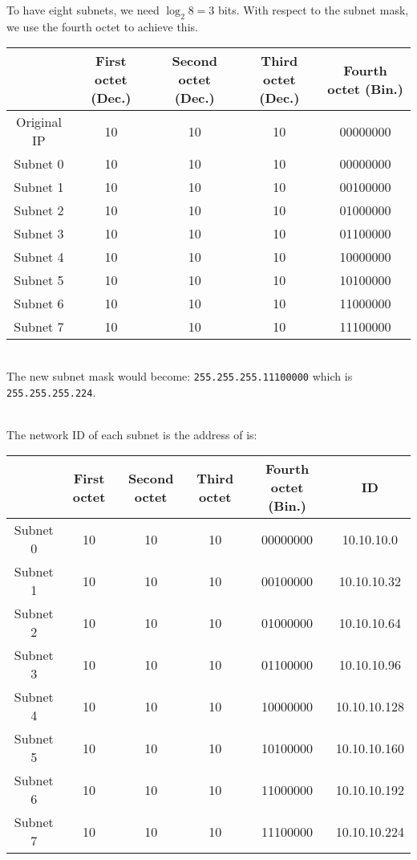 \documentclass{article}
\begin{document}
To have eight subnets, we need $\log_2 8 = 3$ bits. With respect to the subnet mask, we use the fourth octet to achieve this.
\begin{table}[h!]
\centering
\begin{tabular}{|c|c|c|c|c|}
\hline
& First octet (Dec.) & Second octet (Dec.) & Third octet (Dec.) & Fourth octet (Bin.) \\ \hline
Original IP & 10 & 10 & 10 & 00000000 \\
Subnet 0 & 10 & 10 & 10 & 00000000 \\
Subnet 1 & 10 & 10 & 10 & 00100000 \\
Subnet 2 & 10 & 10 & 10 & 01000000 \\
Subnet 3 & 10 & 10 & 10 & 01100000 \\
Subnet 4 & 10 & 10 & 10 & 10000000 \\
Subnet 5 & 10 & 10 & 10 & 10100000 \\
Subnet 6 & 10 & 10 & 10 & 11000000 \\
Subnet 7 & 10 & 10 & 10 & 11100000 \\ \hline
\end{tabular}
\end{table}
~\\The new subnet mask would become: \texttt{255.255.255.11100000} which is \texttt{255.255.255.224}.

~\\The network ID of each subnet is the address of is:
\begin{table}[h!]
\centering
\begin{tabular}{|c|c|c|c|c|c|}
\hline
& First octet & Second octet & Third octet & Fourth octet (Bin.) & ID \\ \hline
Subnet 0 & 10 & 10 & 10 & 00000000 & 10.10.10.0 \\
Subnet 1 & 10 & 10 & 10 & 00100000 & 10.10.10.32 \\
Subnet 2 & 10 & 10 & 10 & 01000000 & 10.10.10.64 \\
Subnet 3 & 10 & 10 & 10 & 01100000 & 10.10.10.96\\
Subnet 4 & 10 & 10 & 10 & 10000000 & 10.10.10.128\\
Subnet 5 & 10 & 10 & 10 & 10100000 & 10.10.10.160 \\
Subnet 6 & 10 & 10 & 10 & 11000000 & 10.10.10.192\\
Subnet 7 & 10 & 10 & 10 & 11100000 & 10.10.10.224 \\ \hline
\end{tabular}
\end{table}
\end{document}
